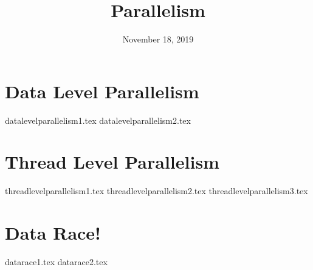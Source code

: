 \documentclass[11pt]{exam}
\title{Parallelism}
\date{November 18, 2019}
\begin{document}
\maketitle

\section{Data Level Parallelism}
\begin{questions}
{datalevelparallelism1.tex}
{datalevelparallelism2.tex}
\end{questions}
\newpage

\section{Thread Level Parallelism}
\begin{questions}
{threadlevelparallelism1.tex}
{threadlevelparallelism2.tex}
{threadlevelparallelism3.tex}
\end{questions}
\newpage

\section{Data Race!}
\begin{questions}
{datarace1.tex}
{datarace2.tex}
\end{questions}
\newpage
\end{document}
